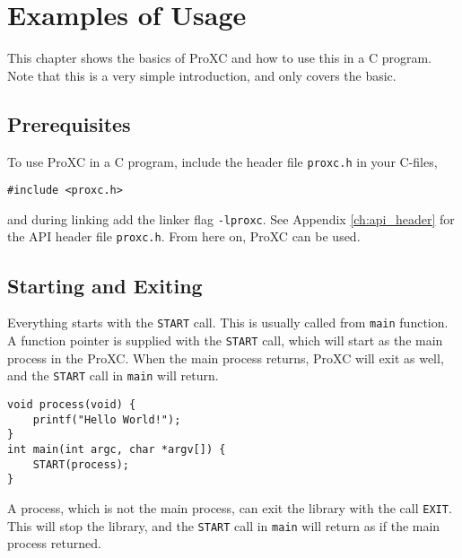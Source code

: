 
\chapter{Examples of Usage}
\label{ch:examples_usage}

This chapter shows the basics of ProXC and how to use this in a C program. Note that this is a very simple introduction, and only covers the basic.

\section*{Prerequisites}

To use ProXC in a C program, include the header file \texttt{proxc.h} in your C\hyp{}files, 

\begin{lstlisting}[style={CustomC},frame={},numbers={none}]
#include <proxc.h>
\end{lstlisting}

\noindent and during linking add the linker flag \texttt{-lproxc}. See Appendix \ref{ch:api_header} for the API header file \texttt{proxc.h}. From here on, ProXC can be used.

\section*{Starting and Exiting}

Everything starts with the \texttt{START} call. This is usually called from \texttt{main} function. A function pointer is supplied with the \texttt{START} call, which will start as the main process in the ProXC. When the main process returns, ProXC will exit as well, and the \texttt{START} call in \texttt{main} will return.

\noindent\begin{minipage}{\textwidth}
\begin{lstlisting}[style={CustomC},caption={Hello World in ProXC}]
void process(void) {
    printf("Hello World!");
}
int main(int argc, char *argv[]) {
    START(process);
}
\end{lstlisting}
\end{minipage}

A process, which is not the main process, can exit the library with the call \texttt{EXIT}. This will stop the library, and the \texttt{START} call in \texttt{main} will return as if the main process returned. 

